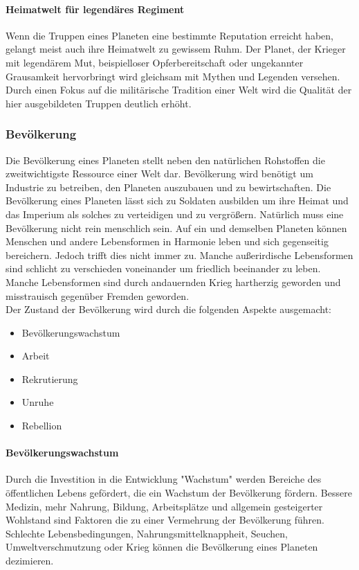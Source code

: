 \documentclass[11pt, a4paper]{article}
\begin{document}
\paragraph{Heimatwelt für legendäres Regiment}
Wenn die Truppen eines Planeten eine bestimmte Reputation erreicht haben, gelangt meist auch ihre Heimatwelt
zu gewissem Ruhm. Der Planet, der Krieger mit legendärem Mut, beispielloser Opferbereitschaft oder ungekannter
Grausamkeit hervorbringt wird gleichsam mit Mythen und Legenden versehen. Durch einen Fokus auf die 
militärische Tradition einer Welt wird die Qualität der hier ausgebildeten Truppen deutlich erhöht.

\subsubsection{Bevölkerung}
Die Bevölkerung eines Planeten stellt neben den natürlichen Rohstoffen die zweitwichtigste Ressource einer Welt 
dar. Bevölkerung wird benötigt um Industrie zu betreiben, den Planeten auszubauen und zu bewirtschaften.
Die Bevölkerung eines Planeten lässt sich zu Soldaten ausbilden um ihre Heimat und das Imperium als solches
zu verteidigen und zu vergrößern. Natürlich muss eine Bevölkerung nicht rein menschlich sein. Auf ein und 
demselben Planeten können Menschen und andere Lebensformen in Harmonie leben und sich gegenseitig bereichern.
Jedoch trifft dies nicht immer zu. Manche außerirdische Lebensformen sind schlicht zu verschieden voneinander
um friedlich beeinander zu leben. Manche Lebensformen sind durch andauernden Krieg hartherzig geworden und
misstrauisch gegenüber Fremden geworden.\\
Der Zustand der Bevölkerung wird durch die folgenden Aspekte ausgemacht:
\begin{itemize}
    \item Bevölkerungswachstum
    \item Arbeit
    \item Rekrutierung
    \item Unruhe
    \item Rebellion
\end{itemize}
%
\paragraph{Bevölkerungswachstum}
Durch die Investition in die Entwicklung "Wachstum" werden Bereiche des öffentlichen Lebens gefördert, die 
ein Wachstum der Bevölkerung fördern. Bessere Medizin, mehr Nahrung, Bildung, Arbeitsplätze und allgemein 
gesteigerter Wohlstand sind Faktoren die zu einer Vermehrung der Bevölkerung führen.
Schlechte Lebensbedingungen, Nahrungsmittelknappheit, Seuchen, Umweltverschmutzung oder Krieg können die 
Bevölkerung eines Planeten dezimieren.
%
\end{document}
